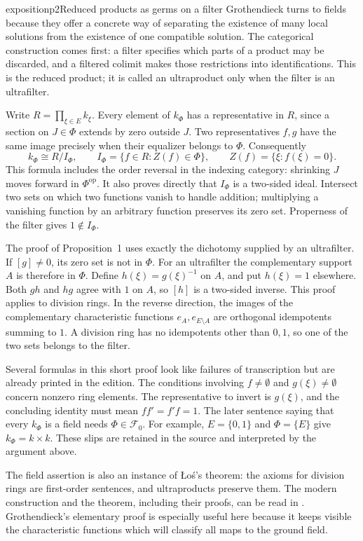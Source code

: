 \begin{dcomment}{exposition}{p2}{Reduced products as germs on a filter}
Grothendieck turns to fields because they offer a concrete way of separating the existence of many local solutions from the existence of one compatible solution. The categorical construction comes first: a filter specifies which parts of a product may be discarded, and a filtered colimit makes those restrictions into identifications. This is the reduced product; it is called an ultraproduct only when the filter is an ultrafilter.

Write $R=\prod_{\xi\in E}k_\xi$. Every element of $k_\Phi$ has a representative in $R$, since a section on $J\in\Phi$ extends by zero outside $J$. Two representatives $f,g$ have the same image precisely when their equalizer belongs to $\Phi$. Consequently
\[
 k_\Phi\cong R/I_\Phi,
 \qquad
 I_\Phi=\{f\in R:Z(f)\in\Phi\},
 \qquad Z(f)=\{\xi:f(\xi)=0\}.
\]
This formula includes the order reversal in the indexing category: shrinking $J$ moves forward in $\Phi^{\mathrm{op}}$. It also proves directly that $I_\Phi$ is a two-sided ideal. Intersect two sets on which two functions vanish to handle addition; multiplying a vanishing function by an arbitrary function preserves its zero set. Properness of the filter gives $1\notin I_\Phi$.

The proof of Proposition~1 uses exactly the dichotomy supplied by an ultrafilter. If $[g]\ne0$, its zero set is not in $\Phi$. For an ultrafilter the complementary support $A$ is therefore in $\Phi$. Define $h(\xi)=g(\xi)^{-1}$ on $A$, and put $h(\xi)=1$ elsewhere. Both $gh$ and $hg$ agree with $1$ on $A$, so $[h]$ is a two-sided inverse. This proof applies to division rings. In the reverse direction, the images of the complementary characteristic functions $e_A,e_{E\setminus A}$ are orthogonal idempotents summing to $1$. A division ring has no idempotents other than $0,1$, so one of the two sets belongs to the filter.

Several formulas in this short proof look like failures of transcription but are already printed in the edition. The conditions involving $f\ne\emptyset$ and $g(\xi)\ne\emptyset$ concern nonzero ring elements. The representative to invert is $g(\xi)$, and the concluding identity must mean $ff'=f'f=1$. The later sentence saying that every $k_\Phi$ is a field needs $\Phi\in\mathcal F_0$. For example, $E=\{0,1\}$ and $\Phi=\{E\}$ give $k_\Phi=k\times k$. These slips are retained in the source and interpreted by the argument above.

The field assertion is also an instance of \L o\'s's theorem: the axioms for division rings are first-order sentences, and ultraproducts preserve them. The modern construction and the theorem, including their proofs, can be read in \citet[Definitions~2.4--2.5 and Theorem~3.1]{Keisler2010Ultraproduct}. Grothendieck's elementary proof is especially useful here because it keeps visible the characteristic functions which will classify all maps to the ground field.
\end{dcomment}

